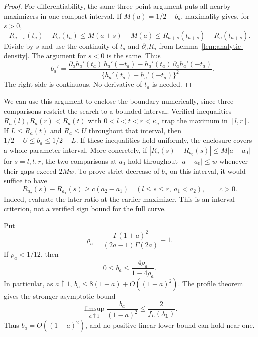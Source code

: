 \begin{proof}
For differentiability, the same three-point argument puts all nearby
maximizers in one compact interval. If $M(a)=1/2-b_a$, maximality gives,
for $s>0$,
\[
 R_{a+s}(t_a)-R_a(t_a)
 \le M(a+s)-M(a)
 \le R_{a+s}(t_{a+s})-R_a(t_{a+s}).
\]
Divide by $s$ and use the continuity of $t_a$ and
$\partial_aR_a$ from Lemma~\ref{lem:analytic-density}. The argument
for $s<0$ is the same. Thus
\begin{equation}\label{eq:bias-envelope-derivative}
 -b_a'=
 \frac{\partial_a h_a'(t_a)\,h_a'(-t_a)
       -h_a'(t_a)\,\partial_a h_a'(-t_a)}
      {\{h_a'(t_a)+h_a'(-t_a)\}^2}.
\end{equation}
The right side is continuous. No derivative of $t_a$ is needed.
\end{proof}

We can use this argument to enclose the boundary numerically, since
three comparisons restrict the search to a bounded interval.
Verified inequalities $R_a(l),R_a(r)<R_a(t)$ with
$0<l<t<r<\kappa_a$ trap the
maximum in $[l,r]$. If $L\le R_a(t)$ and $R_a\le U$ throughout
that interval, then $1/2-U\le b_a\le1/2-L$. If these inequalities hold uniformly, the enclosure covers a whole
parameter interval. More concretely, if
$|R_a(s)-R_{a_0}(s)|\le M|a-a_0|$ for $s=l,t,r$, the two
comparisons at $a_0$ hold throughout $|a-a_0|\le w$ whenever their
gaps exceed $2Mw$. To prove strict decrease of $b_a$ on this interval,
it would suffice to have
\[
 R_{a_2}(s)-R_{a_1}(s)\ge c(a_2-a_1)
 \quad(l\le s\le r,\ a_1<a_2),\qquad c>0.
\]
Indeed, evaluate the later ratio at the earlier maximizer.
This is an interval criterion, not a verified sign bound for the full curve.

\begin{corollary}\label{cor:bias-boundary-rate}
Put
\[
 \rho_a=\frac{\Gamma(1+a)^2}{(2a-1)\Gamma(2a)}-1.
\]
If $\rho_a<1/12$, then
\[
 0\le b_a\le\frac{4\rho_a}{1-4\rho_a}.
\]
In particular, as $a\uparrow1$,
$b_a\le8(1-a)+O((1-a)^2)$.
The profile theorem gives the stronger asymptotic bound
\begin{equation}\label{eq:bias-quadratic}
 \limsup_{a\uparrow1}\frac{b_a}{(1-a)^2}
 \le\frac{2}{f_L(\lambda_{\mathrm L})}.
\end{equation}
Thus $b_a=O((1-a)^2)$, and no positive linear lower bound can hold near one.
\end{corollary}

